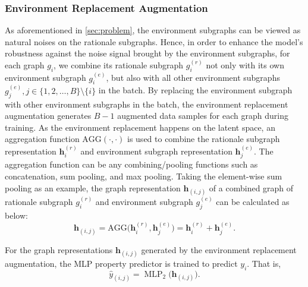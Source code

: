 \documentclass[sigconf]{acmart}
\begin{document}
\subsubsection{Environment Replacement Augmentation}
As aforementioned in \cref{sec:problem}, the environment subgraphs can be viewed as natural noises on the rationale subgraphs. Hence, in order to enhance the model's robustness against the noise signal brought by the environment subgraphs, for each graph $g_i$, we combine its rationale subgraph $g_i^{(r)}$ not only with its own environment subgraph $g_i^{(e)}$, but also with all other environment subgraphs $g_j^{(e)}, j \in \{1, 2, \dots, B\} \setminus \{i\}$ in the batch. By replacing the environment subgraph with other environment subgraphs in the batch, the environment replacement augmentation generates $B-1$ augmented data samples for each graph during training. As the environment replacement happens on the latent space, an aggregation function $\text{AGG}(\cdot, \cdot)$ is used to combine the rationale subgraph representation $\mathbf{h}_i^{(r)}$ and environment subgraph representation $\mathbf{h}_j^{(e)}$. The aggregation function can be any combining/pooling functions such as concatenation, sum pooling, and max pooling. Taking the element-wise sum pooling as an example, the graph representation $\mathbf{h}_{(i,j)}$ of a combined graph of rationale subgraph $g_i^{(r)}$ and environment subgraph $g_j^{(e)}$ can be calculated as below:
\begin{equation}
\label{eq:rat_env_agg}
    \mathbf{h}_{(i,j)} = \text{AGG}\big(\mathbf{h}_i^{(r)}, \mathbf{h}_j^{(e)}\big) = \mathbf{h}_i^{(r)} + \mathbf{h}_j^{(e)}.
\end{equation}

For the graph representations $\mathbf{h}_{(i,j)}$ generated by the environment replacement augmentation, the MLP property predictor is trained to predict $y_i$. That is,
\begin{equation}
\label{eq:mlp2_rep}
    \hat{y}_{(i,j)} = \operatorname{MLP}_2 \big(\mathbf{h}_{(i,j)} \big).
\end{equation}
\end{document}
